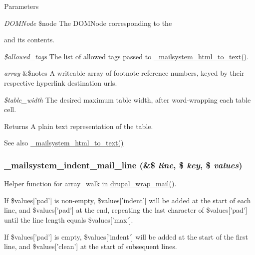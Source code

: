 \begin{DoxyParams}{Parameters}
\item[{\em DOMNode}]\$node The DOMNode corresponding to the \begin{TabularC}{0}
\hline
\end{TabularC}
and its contents. \item[{\em \$allowed\_\-tags}]The list of allowed tags passed to \hyperlink{html__to__text_8inc_af581a74a8de0f0cbedc673623bccdc5d}{\_\-mailsystem\_\-html\_\-to\_\-text()}. \item[{\em array}]\&\$notes A writeable array of footnote reference numbers, keyed by their respective hyperlink destination urls. \item[{\em \$table\_\-width}]The desired maximum table width, after word-\/wrapping each table cell.\end{DoxyParams}
\begin{DoxyReturn}{Returns}
A plain text representation of the table.
\end{DoxyReturn}
\begin{DoxySeeAlso}{See also}
\hyperlink{html__to__text_8inc_af581a74a8de0f0cbedc673623bccdc5d}{\_\-mailsystem\_\-html\_\-to\_\-text()} 
\end{DoxySeeAlso}
\hypertarget{html__to__text_8inc_ad77a7dffe89d0b6cb337b0f36bdb64b3}{
\subsubsection[{\_\-mailsystem\_\-indent\_\-mail\_\-line}]{\setlength{\rightskip}{0pt plus 5cm}\_\-mailsystem\_\-indent\_\-mail\_\-line (\&\$ {\em line}, \/  \$ {\em key}, \/  \$ {\em values})}}
\label{html__to__text_8inc_ad77a7dffe89d0b6cb337b0f36bdb64b3}
Helper function for array\_\-walk in \hyperlink{mail_8inc_a955ffecc70c15ab89079ea29557f7b41}{drupal\_\-wrap\_\-mail()}.

If \$values\mbox{[}'pad'\mbox{]} is non-\/empty, \$values\mbox{[}'indent'\mbox{]} will be added at the start of each line, and \$values\mbox{[}'pad'\mbox{]} at the end, repeating the last character of \$values\mbox{[}'pad'\mbox{]} until the line length equals \$values\mbox{[}'max'\mbox{]}.

If \$values\mbox{[}'pad'\mbox{]} is empty, \$values\mbox{[}'indent'\mbox{]} will be added at the start of the first line, and \$values\mbox{[}'clean'\mbox{]} at the start of subsequent lines.

